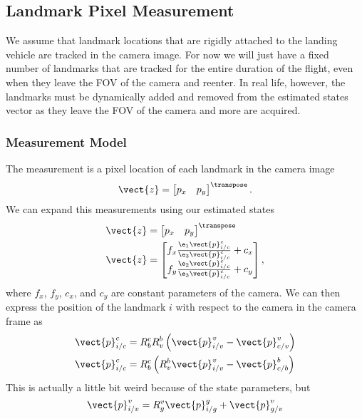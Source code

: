 \subsection{Landmark Pixel Measurement}
We assume that landmark locations that are rigidly attached to the landing
vehicle are tracked in the camera image. For now we will just have a fixed
number of landmarks that are tracked for the entire duration of the flight, even
when they leave the FOV of the camera and reenter. In real life, however, the
landmarks must be dynamically added and removed from the estimated states vector
as they leave the FOV of the camera and more are acquired.

\subsubsection{Measurement Model}
The measurement is a pixel location of each landmark in the camera image
\begin{equation}
  \vect{z} =
  \begin{bmatrix}
    p_x & p_y
  \end{bmatrix}^\transpose.
\end{equation}
We can expand this measurements using our estimated states
\begin{align}
  \vect{z} &=
  \begin{bmatrix}
    p_x & p_y
  \end{bmatrix}^\transpose \\
  \vect{z} &=
  \begin{bmatrix}
    f_x \frac{\e_1 \vect{p}_{i/c}^c}{\e_3 \vect{p}_{i/c}^c} + c_x \\
    f_y \frac{\e_2 \vect{p}_{i/c}^c}{\e_3 \vect{p}_{i/c}^c} + c_y
  \end{bmatrix},
\end{align}
where $f_x$, $f_y$, $c_x$, and $c_y$ are constant parameters of the camera. We
can then express the position of the landmark $i$ with respect to the camera in the
camera frame as
\begin{align}
  \vect{p}_{i/c}^c &= R_b^c R_v^b \left(\vect{p}_{i/v}^v -
    \vect{p}_{c/v}^v\right) \\
    \vect{p}_{i/c}^c &= R_b^c \left(R_v^b \vect{p}_{i/v}^v -
    \vect{p}_{c/b}^b\right)
\end{align}
This is actually a little bit weird because of the state parameters, but
\begin{equation}
  \vect{p}_{i/v}^v = R_g^v \vect{p}_{i/g}^g + \vect{p}_{g/v}^v
\end{equation}

